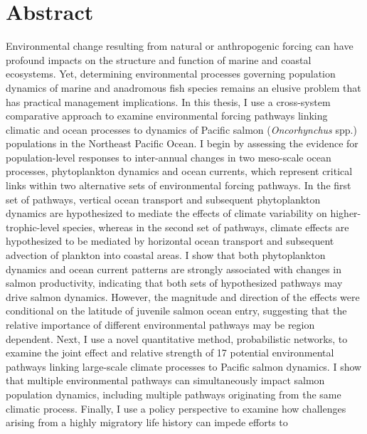 %
%
%


\chapter*{Abstract}


Environmental change resulting from natural or anthropogenic forcing can have
profound impacts on the structure and function of marine and coastal ecosystems.
Yet, determining environmental processes governing population dynamics of marine
and anadromous fish species remains an elusive problem that has practical
management implications. In this thesis, I use a cross-system comparative
approach to examine environmental forcing pathways linking climatic and ocean
processes to dynamics of Pacific salmon (\textit{Oncorhynchus} spp.) populations
in the Northeast Pacific Ocean. I begin by assessing the evidence for
population-level responses to inter-annual changes in two meso-scale ocean
processes, phytoplankton dynamics and ocean currents, which represent critical
links within two alternative sets of environmental forcing pathways. In the
first set of pathways, vertical ocean transport and subsequent phytoplankton
dynamics are hypothesized to mediate the effects of climate variability on
higher-trophic-level species, whereas in the second set of pathways, climate
effects are hypothesized to be mediated by horizontal ocean transport and
subsequent advection of plankton into coastal areas. I show that both
phytoplankton dynamics and ocean current patterns are strongly associated with
changes in salmon productivity, indicating that both sets of hypothesized
pathways may drive salmon dynamics. However, the magnitude and direction of the
effects were conditional on the latitude of juvenile salmon ocean entry,
suggesting that the relative importance of different environmental pathways may
be region dependent. Next, I use a novel quantitative method, probabilistic
networks, to examine the joint effect and relative strength of 17 potential
environmental pathways linking large-scale climate processes to Pacific salmon
dynamics. I show that multiple environmental pathways can simultaneously impact
salmon population dynamics, including multiple pathways originating from the
same climatic process. Finally, I use a policy perspective to examine how
challenges arising from a highly migratory life history can impede efforts to
